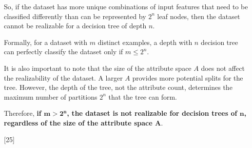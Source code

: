 \documentclass[12pt,letterpaper, onecolumn]{exam}
\begin{document}
\begin{questions}
\begin{parts}
\begin{solution}
        So, if the dataset has more unique combinations of input features that 
        need to be classified differently than can be represented by $2^n$ leaf nodes,
        then the dataset cannot be realizable for a decision tree of depth $n$.

        Formally, for a dataset with $m$ distinct examples, a depth with $n$
        decision tree can perfectly classify the dataset only if $m \leq 2^n$.

        It is also important to note that the size of the attribute space $A$ does 
        not affect the realizability of the dataset. A larger $A$ provides more potential 
        splits for the tree. However, the depth of the tree, not the attribute count, 
        determines the maximum number of partitions $2^n$ that the tree can form.

        Therefore, \textbf{if $\boldsymbol{m > 2^n}$, the dataset is not realizable for decision trees of $\boldsymbol{n}$,
        regardless of the size of the attribute space $\boldsymbol{A}$}.
      
      \end{solution}
      
    \end{parts}

    \pagebreak

    [25]

\end{questions}
\end{document}
